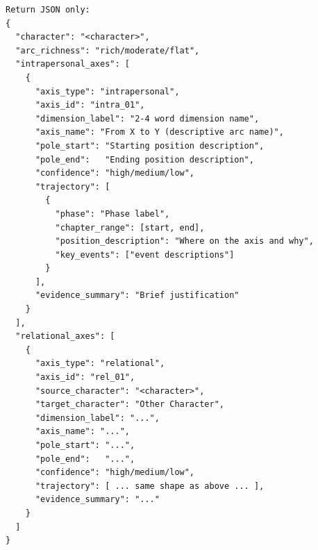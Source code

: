 \documentclass[11pt]{article}
\begin{document}
\begin{table}[htbp]
\begin{lstlisting}[basicstyle=\ttfamily\scriptsize]
Return JSON only:
{
  "character": "<character>",
  "arc_richness": "rich/moderate/flat",
  "intrapersonal_axes": [
    {
      "axis_type": "intrapersonal",
      "axis_id": "intra_01",
      "dimension_label": "2-4 word dimension name",
      "axis_name": "From X to Y (descriptive arc name)",
      "pole_start": "Starting position description",
      "pole_end":   "Ending position description",
      "confidence": "high/medium/low",
      "trajectory": [
        {
          "phase": "Phase label",
          "chapter_range": [start, end],
          "position_description": "Where on the axis and why",
          "key_events": ["event descriptions"]
        }
      ],
      "evidence_summary": "Brief justification"
    }
  ],
  "relational_axes": [
    {
      "axis_type": "relational",
      "axis_id": "rel_01",
      "source_character": "<character>",
      "target_character": "Other Character",
      "dimension_label": "...",
      "axis_name": "...",
      "pole_start": "...",
      "pole_end":   "...",
      "confidence": "high/medium/low",
      "trajectory": [ ... same shape as above ... ],
      "evidence_summary": "..."
    }
  ]
}
\end{lstlisting}
\end{table}
\end{document}
